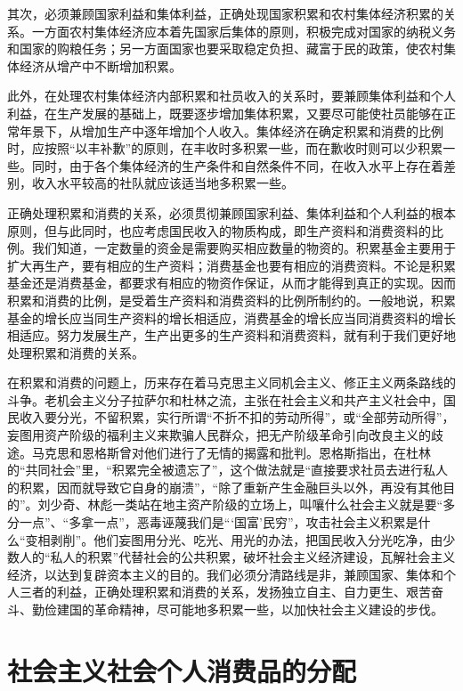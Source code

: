 \documentclass{book}
\begin{document}
其次，必须兼顾国家利益和集体利益，正确处现国家积累和农村集体经济积累的关系。一方面农村集体经济应本着先国家后集体的原则，积极完成对国家的纳税义务和国家的购粮任务；另一方面国家也要采取稳定负担、藏富于民的政策，使农村集体经济从增产中不断增加积累。

此外，在处理农村集体经济内部积累和社员收入的关系时，要兼顾集体利益和个人利益，在生产发展的基础上，既要逐步增加集体积累，又要尽可能使社员能够在正常年景下，从增加生产中逐年增加个人收入。集体经济在确定积累和消费的比例时，应按照“以丰补歉”的原则，在丰收时多积累一些，而在歉收时则可以少积累一些。同时，由于各个集体经济的生产条件和自然条件不同，在收入水平上存在着差别，收入水平较高的社队就应该适当地多积累一些。

正确处理积累和消费的关系，必须贯彻兼顾国家利益、集体利益和个人利益的根本原则，但与此同时，也应考虑国民收入的物质构成，即生产资料和消费资料的比例。我们知道，一定数量的资金是需要购买相应数量的物资的。积累基金主要用于扩大再生产，要有相应的生产资料；消费基金也要有相应的消费资料。不论是积累基金还是消费基金，都要求有相应的物资作保证，从而才能得到真正的实现。因而积累和消费的比例，是受着生产资料和消费资料的比例所制约的。一般地说，积累基金的增长应当同生产资料的增长相适应，消费基金的增长应当同消费资料的增长相适应。努力发展生产，生产出更多的生产资料和消费资料，就有利于我们更好地处理积累和消费的关系。

在积累和消费的问题上，历来存在着马克思主义同机会主义、修正主义两条路线的斗争。老机会主义分子拉萨尔和杜林之流，主张在社会主义和共产主义社会中，国民收入要分光，不留积累，实行所谓“不折不扣的劳动所得”，或“全部劳动所得”，妄图用资产阶级的福利主义来欺骗人民群众，把无产阶级革命引向改良主义的歧途。马克思和恩格斯曾对他们进行了无情的揭露和批判。恩格斯指出，在杜林的“共同社会”里，“积累完全被遗忘了”，这个做法就是“直接要求社员去进行私人的积累，因而就导致它自身的崩溃”，“除了重新产生金融巨头以外，再没有其他目的”。刘少奇、林彪一类站在地主资产阶级的立场上，叫嚷什么社会主义就是要“多分一点”、“多拿一点”，恶毒诬蔑我们是“‘国富’民穷”，攻击社会主义积累是什么“变相剥削”。他们妄图用分光、吃光、用光的办法，把国民收入分光吃净，由少数人的“私人的积累”代替社会的公共积累，破坏社会主义经济建设，瓦解社会主义经济，以达到复辟资本主义的目的。我们必须分清路线是非，兼顾国家、集体和个人三者的利益，正确处理积累和消费的关系，发扬独立自主、自力更生、艰苦奋斗、勤俭建国的革命精神，尽可能地多积累一些，以加快社会主义建设的步伐。

\section{社会主义社会个人消费品的分配}
\end{document}
